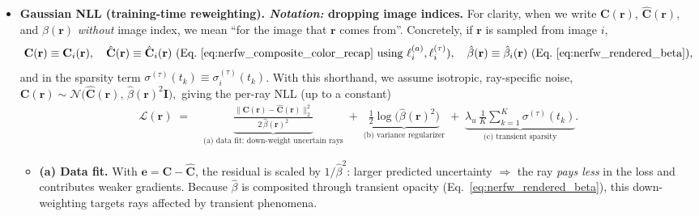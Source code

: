 \begin{enrichment}
\begin{enrichment}
\begin{itemize}[leftmargin=*,itemsep=0.25em]
            \item \textbf{Gaussian NLL (training-time reweighting). \emph{Notation:} dropping image indices.}
            For clarity, when we write \(\mathbf{C}(\mathbf{r})\), \(\hat{\mathbf{C}}(\mathbf{r})\), and \(\hat{\beta}(\mathbf{r})\) \emph{without} image index, we mean “for the image that \(\mathbf{r}\) comes from”. Concretely, if \(\mathbf{r}\) is sampled from image \(i\),
            \[
            \mathbf{C}(\mathbf{r}) \equiv \mathbf{C}_i(\mathbf{r}),\quad
            \hat{\mathbf{C}}(\mathbf{r}) \equiv \hat{\mathbf{C}}_i(\mathbf{r})\ \text{(Eq.~\eqref{eq:nerfw_composite_color_recap} using }\ell^{(a)}_i,\ell^{(\tau)}_i\text{)},\quad
            \hat{\beta}(\mathbf{r}) \equiv \hat{\beta}_i(\mathbf{r})\ \text{(Eq.~\eqref{eq:nerfw_rendered_beta})},
            \]
            and in the sparsity term \(\sigma^{(\tau)}(t_k)\equiv\sigma^{(\tau)}_i(t_k)\).
            With this shorthand, we assume isotropic, ray-specific noise,
            \(
            \mathbf{C}(\mathbf{r}) \sim \mathcal{N}\!\big(\hat{\mathbf{C}}(\mathbf{r}),\,\hat{\beta}(\mathbf{r})^2\mathbf{I}\big),
            \)
            giving the per-ray NLL (up to a constant)
            \begin{equation}
                \label{eq:nerfw_gauss_nll_recap}
                \begin{aligned}
                    \mathcal{L}(\mathbf{r})
                    \;=\;&
                    \underbrace{\frac{\big\|\mathbf{C}(\mathbf{r})-\hat{\mathbf{C}}(\mathbf{r})\big\|_2^2}{2\,\hat{\beta}(\mathbf{r})^2}}_{\text{(a) data fit: down-weight uncertain rays}}
                    \;+\;
                    \underbrace{\tfrac{1}{2}\log\!\big(\hat{\beta}(\mathbf{r})^2\big)}_{\text{(b) variance regularizer}}
                    \;+\;
                    \underbrace{\lambda_u\,\frac{1}{K}\sum_{k=1}^{K}\sigma^{(\tau)}(t_k)}_{\text{(c) transient sparsity}}.
                \end{aligned}
            \end{equation}
            \begin{itemize}[leftmargin=1.25em,itemsep=0.15em]
                \item \textbf{(a) Data fit.} With \(\mathbf{e}=\mathbf{C}-\hat{\mathbf{C}}\), the residual is scaled by \(1/\hat{\beta}^2\): larger predicted uncertainty \(\Rightarrow\) the ray \emph{pays less} in the loss and contributes weaker gradients. Because \(\hat{\beta}\) is composited through transient opacity (Eq.~\eqref{eq:nerfw_rendered_beta}), this down-weighting targets rays affected by transient phenomena.

\end{itemize}
\end{itemize}
\end{enrichment}
\end{enrichment}
